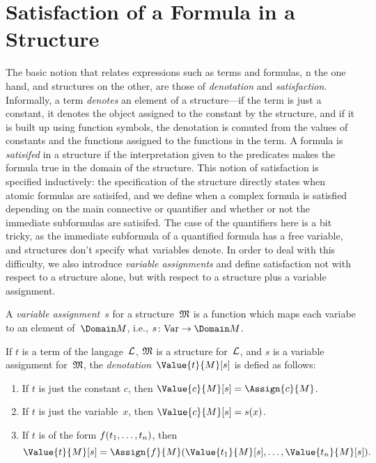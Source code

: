 \documentclass[syntax-and-semantics]{subfiles}
\begin{document}
\section{Satisfaction of a Formula in a Structure}

\begin{wordy}
The basic notion that relates expressions such as terms and formulas,
n the one hand, and structures on the other, are those of
\emph{denotation} and \emph{satisfaction}.  Informally, a term
\emph{denotes} an element of a structure---if the term is just a
constant, it denotes the object assigned to the constant by the
structure, and if it is built up using function symbols, the
denotation is comuted from the values of constants and the functions
assigned to the functions in the term.  A formula is \emph{satisifed}
in a structure if the interpretation given to the predicates makes the
formula true in the domain of the structure. This notion of
satisfaction is specified inductively: the specification of the
structure directly states when atomic formulas are satisifed, and we
define when a complex formula is satisfied depending on the main
connective or quantifier and whether or not the immediate subformulas
are satisifed. The case of the quantifiers here is a bit tricky, as
the immediate subformula of a quantified formula has a free variable,
and structures don't specify what variables denote.  In order to deal
with this difficulty, we also introduce \emph{variable assignments}
and define satisfaction not with respect to a structure alone, but
with respect to a structure plus a variable assignment.
\end{wordy}

\begin{defn}
A \emph{variable assignment}~$s$ for a structure~$\mathfrak{M}$ is a
function which maps each variabe to an element of~$\Domain M$, i.e.,
$s\colon \Var \to \Domain M$.
\end{defn}

\begin{defn}
If $t$ is a term of the langage~$\mathcal L$, $\mathfrak M$ is a structure
for~$\mathcal L$, and $s$ is a variable assignment for~$\mathfrak M$, the
\emph{denotation}~$\Value{t}{M}[s]$ is defied as follows:
\begin{enumerate}
\item If $t$ is just the constant $c$, then $\Value{c}{M}[s] = \Assign{c}{M}$.
\item If $t$ is just the variable~$x$, then $\Value{c}{M}[s] = s(x)$.
\item If $t$ is of the form ${ f(t_1, \ldots, t_n) }$, then
\[
\Value{t}{M}[s] = \Assign{f}{M}(\Value{t_1}{M}[s], \ldots,
\Value{t_n}{M}[s]).
\]
\end{enumerate}
\end{defn}
\end{document}
